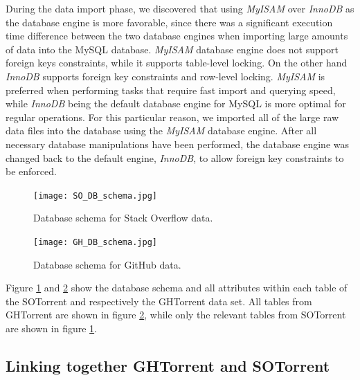         During the data import phase, we discovered that using \textit{MyISAM} over \textit{InnoDB} as the database engine is more favorable, since there was a significant execution time difference between the two database engines when importing large amounts of data into the MySQL database. \textit{MyISAM} database engine does not support foreign keys constraints, while it supports table-level locking. On the other hand \textit{InnoDB} supports foreign key constraints and row-level locking. \textit{MyISAM} is preferred when performing tasks that require fast import and querying speed, while \textit{InnoDB} being the default database engine for MySQL is more optimal for regular operations. For this particular reason, we imported all of the large raw data files into the database using the \textit{MyISAM} database engine. After all necessary database manipulations have been performed, the database engine was changed back to the default engine, \textit{InnoDB}, to allow foreign key constraints to be enforced. 
     
      
        \begin{figure}[!ht]
          \centering
          \texttt{[image: SO\_DB\_schema.jpg]}\\
          \caption{Database schema for Stack Overflow data.}
          \label{fig:so_schema}
        \end{figure}
        
 
        \begin{figure}[!ht]
          \centering
          \texttt{[image: GH\_DB\_schema.jpg]}\\
          \caption{Database schema for GitHub data.}
          \label{fig:gh_schema}
        \end{figure}
        
        
        Figure \ref{fig:so_schema} and \ref{fig:gh_schema} show the database schema and all attributes within each table of the SOTorrent and respectively the GHTorrent data set. All tables from GHTorrent are shown in figure \ref{fig:gh_schema}, while only the relevant tables from SOTorrent are shown in figure \ref{fig:so_schema}. 


    \subsection{Linking together GHTorrent and SOTorrent}\label{Linking_SO_GH}
    
